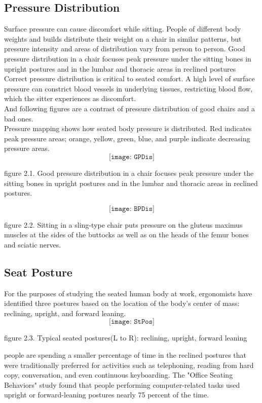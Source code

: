 \documentclass[paper=a4, fontsize=12pt, ]{scrartcl} %
\numberwithin{equation}{section} %
\numberwithin{figure}{section} %
\numberwithin{table}{section} %
\begin{document}
\subsection{Pressure Distribution}
Surface pressure can cause discomfort while sitting. People of different body weights and builds distribute their weight on a chair in similar patterns, but pressure intensity and areas of distribution vary from person to person. Good pressure distribution in a chair focuses peak pressure under the sitting bones in upright postures and in the lumbar and thoracic areas in reclined postures
\\
Correct pressure distribution is critical to seated comfort. A high level of surface pressure can constrict blood vessels in underlying tissues, restricting blood flow, which the sitter experiences as discomfort.
\\
And following figures are a contrast of pressure distribution of good chairs and a bad ones.
\\
Pressure mapping shows how seated body pressure is distributed. Red indicates peak pressure areas; orange, yellow, green, blue, and purple indicate decreasing pressure areas.
\vspace{1 cm}
$$\texttt{[image: GPDis]}$$
\begin{footnotesize}
figure 2.1. Good pressure distribution in a chair focuses peak pressure under the sitting bones in upright postures and in the lumbar and thoracic areas in reclined postures.
\end{footnotesize}
\vspace{1 cm}
$$\texttt{[image: BPDis]}$$
\begin{footnotesize}
figure 2.2. Sitting in a sling-type chair puts pressure on the gluteus maximus muscles at the sides of the buttocks as well as on the heads of the femur bones and sciatic nerves.
\end{footnotesize}

\subsection{Seat Posture}
For the purposes of studying the seated human body at work, ergonomists have identified three postures based on the location of the body’s center of mass: reclining, upright, and forward leaning.
\vspace{1 cm}
$$\texttt{[image: StPos]}$$
\begin{footnotesize}
figure 2.3. Typical seated postures(L to R): reclining, upright, forward leaning
\end{footnotesize}
people are spending a smaller percentage of time in the reclined postures that were traditionally preferred for activities such as telephoning, reading from hard copy, conversation, and even continuous keyboarding. The "Office Seating Behaviors" study found that people performing computer-related tasks used upright or forward-leaning postures nearly 75 percent of the time.
\end{document}
